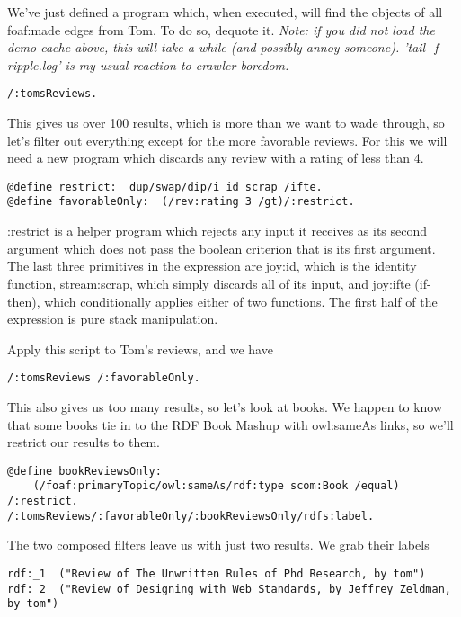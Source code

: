 \documentclass[runningheads]{llncs}
\begin{document}
We've just defined a program which, when executed, will find the objects of all
foaf:made edges from Tom.  To do so, dequote it.
{\it Note: if you did not load the demo cache above, this will take a while (and possibly annoy someone).  'tail -f ripple.log' is my usual reaction to crawler boredom.}

\begin{verbatim}
/:tomsReviews.
\end{verbatim}

This gives us over 100 results, which is more than we want to wade through, so let's filter out everything except for the more favorable reviews.  For this we will need a new program which discards any review with a rating of less than 4.

\begin{verbatim}
@define restrict:  dup/swap/dip/i id scrap /ifte.
@define favorableOnly:  (/rev:rating 3 /gt)/:restrict.
\end{verbatim}

:restrict is a helper program which rejects any input it receives as its second argument which does not pass the boolean criterion that is its first argument.  The last three primitives in the expression are joy:id, which is the identity function, stream:scrap, which simply discards all of its input, and joy:ifte (if-then), which conditionally applies either of two functions.  The first half of the expression is pure stack manipulation.

Apply this script to Tom's reviews, and we have

\begin{verbatim}
/:tomsReviews /:favorableOnly.
\end{verbatim}

This also gives us too many results, so let's look at books.  We happen to know that some books tie in to the RDF Book Mashup with owl:sameAs links, so we'll restrict our results to them.

\begin{verbatim}
@define bookReviewsOnly:
    (/foaf:primaryTopic/owl:sameAs/rdf:type scom:Book /equal) /:restrict.
/:tomsReviews/:favorableOnly/:bookReviewsOnly/rdfs:label.
\end{verbatim}

The two composed filters leave us with just two results.  We grab their labels

\begin{verbatim}
rdf:_1  ("Review of The Unwritten Rules of Phd Research, by tom")
rdf:_2  ("Review of Designing with Web Standards, by Jeffrey Zeldman, by tom")
\end{verbatim}
\end{document}
